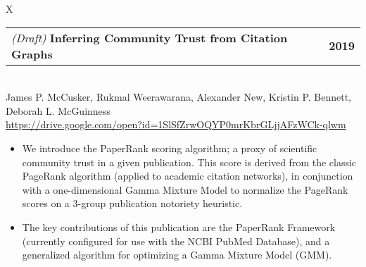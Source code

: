 \documentclass[10pt]{article}
\newcommand{\tabularxwidth}{\textwidth}
\begin{document}
        \begin{minipage}{\tabularxwidth}
        \begin{tabularx}{\tabularxwidth}{X}
            {
                \begin{tabularx}{\tabularxwidth}{@{}X r}
                        \textit{(Draft) }
                    \textbf{Inferring Community Trust from Citation Graphs} &
                    \textbf{
        2019} \\
                \end{tabularx}
            } \\
            James P. McCusker, Rukmal Weerawarana, Alexander New, Kristin P. Bennett, Deborah L. McGuinness \\

            
            
                \url{https://drive.google.com/open?id=1SlSfZrwOQYP0mrKbrGLjjAFzWCk-qlwm} \\
            
            
        \end{tabularx}

        \begin{itemize}[noitemsep, topsep=3pt, parsep=0pt, partopsep=0pt]
            
                \item 
    We introduce the PaperRank scoring algorithm; a proxy of scientific community trust in a given publication. This score is derived from the classic PageRank algorithm (applied to academic citation networks), in conjunction with a one-dimensional Gamma Mixture Model to normalize the PageRank scores on a 3-group publication notoriety heuristic.
            
                \item 
    The key contributions of this publication are the PaperRank Framework (currently configured for use with the NCBI PubMed Database), and a generalized algorithm for optimizing a Gamma Mixture Model (GMM).
            

\end{itemize}
\end{minipage}
\end{document}
